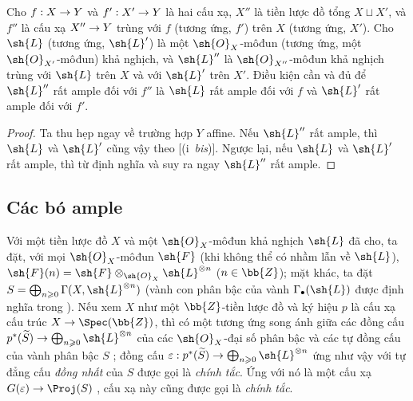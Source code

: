\documentclass[oneside,10pt]{amsart}
\makeatletter
\renewcommand{\geq}{\geqslant}
\newcommand{\ega@arrow}[2]{\mathchoice{#1}{#2}{#2}{#2}}
\renewcommand{\to}{\ega@arrow{\longrightarrow}{\rightarrow}}
\let\EGAOriginalLabel\label
\renewcommand{\label}[1]{\phantomsection\EGAOriginalLabel{#1}}
\makeatother
\begin{document}
\begin{proposition}[4.4.11]
\label{II.4.4.11}
Cho $f:X\to Y$ và $f':X'\to Y$ là hai cấu xạ, $X''$ là tiền lược đồ tổng $X\sqcup X'$, và $f''$ là cấu xạ $X''\to Y$ trùng với $f$ (tương ứng, $f'$) trên $X$ (tương ứng, $X'$).
Cho $\sh{L}$ (tương ứng, $\sh{L}'$) là một $\sh{O}_X$-môđun (tương ứng, một $\sh{O}_{X'}$-môđun) khả nghịch, và $\sh{L}''$ là $\sh{O}_{X''}$-môđun khả nghịch trùng với $\sh{L}$ trên $X$ và với $\sh{L}'$ trên $X'$.
Điều kiện cần và đủ để $\sh{L}''$ rất ample đối với $f''$ là $\sh{L}$ rất ample đối với $f$ và $\sh{L}'$ rất ample đối với $f'$.
\end{proposition}

\begin{proof}
Ta thu hẹp ngay về trường hợp $Y$ affine.
Nếu $\sh{L}''$ rất ample, thì $\sh{L}$ và $\sh{L}'$ cũng vậy theo [(i~\emph{bis})].
Ngược lại, nếu $\sh{L}$ và $\sh{L}'$ rất ample, thì từ định nghĩa  và  suy ra ngay $\sh{L}''$ rất ample.
\end{proof}

\subsection{Các bó ample}
\label{subsection:II.4.5}

\begin{env}[4.5.1]
\label{II.4.5.1}
Với một tiền lược đồ $X$ và một $\sh{O}_X$-môđun khả nghịch $\sh{L}$ đã cho, ta đặt, với mọi $\sh{O}_X$-môđun $\sh{F}$ (khi không thể có nhầm lẫn về $\sh{L}$), $\sh{F}(n)=\sh{F}\otimes_{\sh{O}_X}\sh{L}^{\otimes n}$ ($n\in\bb{Z}$);
mặt khác, ta đặt $S=\bigoplus_{n\geq0}\Gamma(X,\sh{L}^{\otimes n})$ (vành con phân bậc của vành $\Gamma_\bullet(\sh{L})$ được định nghĩa trong ).
Nếu xem $X$ như một $\bb{Z}$-tiền lược đồ và ký hiệu $p$ là cấu xạ cấu trúc $X\to\Spec(\bb{Z})$, thì có một tương ứng song ánh giữa các đồng cấu $p^*(\widetilde{S})\to\bigoplus_{n\geq0}\sh{L}^{\otimes n}$ của các $\sh{O}_X$-đại số phân bậc và các tự đồng cấu của vành phân bậc $S$ ;
đồng cấu $\varepsilon:p^*(\widetilde{S})\to\bigoplus_{n\geq0}\sh{L}^{\otimes n}$ ứng như vậy với tự đẳng cấu \emph{đồng nhất} của $S$ được gọi là \emph{chính tắc}.
Ứng với nó là một cấu xạ $G(\varepsilon)\to\Proj(S)$ , cấu xạ này cũng được gọi là \emph{chính tắc}.
\end{env}
\end{document}
